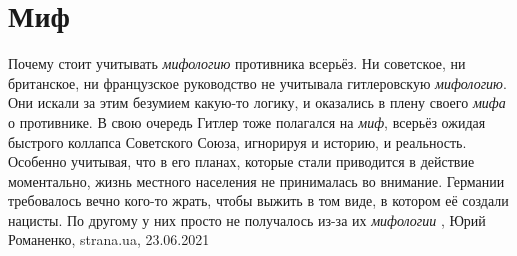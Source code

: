  
 
 
 
 
\chapter{Миф}

Почему стоит учитывать \emph{мифологию} противника всерьёз.  Ни советское, ни
британское, ни французское руководство не учитывала гитлеровскую
\emph{мифологию}. Они искали за этим безумием какую-то логику, и оказались в
плену своего \emph{мифа} о противнике. В свою очередь Гитлер тоже полагался на
\emph{миф}, всерьёз ожидая быстрого коллапса Советского Союза, игнорируя и
историю, и реальность. Особенно учитывая, что в его планах, которые стали
приводится в действие моментально, жизнь местного населения не принималась во
внимание. Германии требовалось вечно кого-то жрать, чтобы выжить в том виде, в
котором её создали нацисты. По другому у них просто не получалось из-за их
\emph{мифологии}
, 
Юрий Романенко, strana.ua, 23.06.2021

